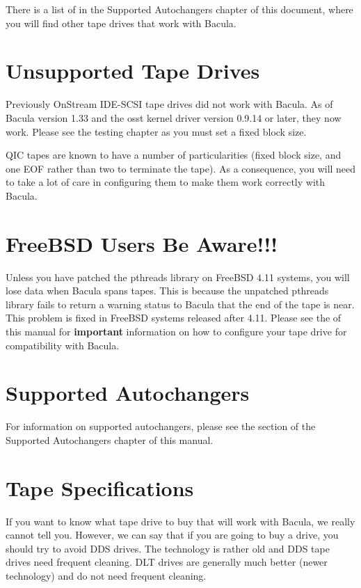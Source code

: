 There is a list of  in the Supported
Autochangers chapter of this document, where you will find other tape drives
that work with Bacula. 

\section{Unsupported Tape Drives}
\label{UnSupportedDrives}

Previously OnStream IDE-SCSI tape drives did not work with Bacula. As of
Bacula version 1.33 and the osst kernel driver version 0.9.14 or later, they
now work. Please see the testing chapter as you must set a fixed block size. 

QIC tapes are known to have a number of particularities (fixed block size, and
one EOF rather than two to terminate the tape). As a consequence, you will
need to take a lot of care in configuring them to make them work correctly
with Bacula. 

\section{FreeBSD Users Be Aware!!!}

Unless you have patched the pthreads library on FreeBSD 4.11 systems, you will
lose data when Bacula spans tapes. This is because the unpatched pthreads
library fails to return a warning status to Bacula that the end of the tape is
near. This problem is fixed in FreeBSD systems released after 4.11. Please see the 
 of this manual for
{\bf important} information on how to configure your tape drive for
compatibility with Bacula. 

\section{Supported Autochangers}

For information on supported autochangers, please see the 
section of the Supported Autochangers chapter of this manual. 

\section{Tape Specifications}
If you want to know what tape drive to buy that will work with Bacula,
we really cannot tell you.  However, we can say that if you are going
to buy a drive, you should try to avoid DDS drives. The technology is
rather old and DDS tape drives need frequent cleaning.  DLT drives are 
generally much better (newer technology) and do not need frequent 
cleaning.

